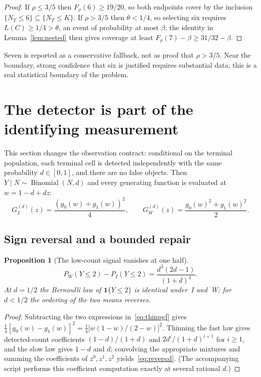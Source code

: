 \documentclass[11pt,a4paper]{article}
\theoremstyle{plain}
\newtheorem{proposition}[theorem]{Proposition}
\theoremstyle{definition}
\theoremstyle{remark}
\newcommand{\ind}{\mathbf 1}
\newcommand{\Bin}{\operatorname{Binomial}}
\begin{document}
\begin{proof}
If $\rho\le3/5$ then $F_\rho(6)\ge19/20$, so both endpoints cover by the inclusion $\{N_T\le6\}\subseteq\{N_T\le K\}$. If $\rho>3/5$ then $\theta<1/4$, so selecting six requires $L(C)\ge1/4>\theta$, an event of probability at most $\beta$; the identity in Lemma~\ref{lem:nested} then gives coverage at least $F_\rho(7)-\beta\ge31/32-\beta$.
\end{proof}

Seven is reported as a conservative fallback, not as proof that $\rho>3/5$. Near the boundary, strong confidence that six is justified requires substantial data; this is a real statistical boundary of the problem.

\section{The detector is part of the identifying measurement}\label{sec:detector}

This section changes the observation contract: conditional on the terminal population, each terminal cell is detected independently with the same probability $d\in[0,1]$, and there are no false objects. Then $Y\mid N\sim\Bin(N,d)$ and every generating function is evaluated at $w=1-d+dz$:
\begin{equation}\label{eq:thinpgf}
G^{(d)}_I(z)=\frac{(g_0(w)+g_1(w))^2}{4},\qquad G^{(d)}_W(z)=\frac{g_0(w)^2+g_1(w)^2}{2}.
\end{equation}

\subsection{Sign reversal and a bounded repair}
\begin{proposition}[The low-count signal vanishes at one half]\label{prop:reversal}
\begin{equation}\label{eq:reversal}
P_W(Y\le2)-P_I(Y\le2)=\frac{d^3(2d-1)}{(1+d)^4}.
\end{equation}
At $d=1/2$ the Bernoulli law of $\ind\{Y\le2\}$ is identical under~I and~W; for $d<1/2$ the ordering of the two means reverses.
\end{proposition}
\begin{proof}
Subtracting the two expressions in~\eqref{eq:thinpgf} gives $\tfrac14[g_0(w)-g_1(w)]^2=\tfrac14\bigl[w(1-w)/(2-w)\bigr]^2$. Thinning the fast law gives detected-count coefficients $(1-d)/(1+d)$ and $2d^i/(1+d)^{i+1}$ for $i\ge1$, and the slow law gives $1-d$ and $d$; convolving the appropriate mixtures and summing the coefficients of $z^0,z^1,z^2$ yields~\eqref{eq:reversal}. (The accompanying script performs this coefficient computation exactly at several rational $d$.)
\end{proof}
\end{document}
